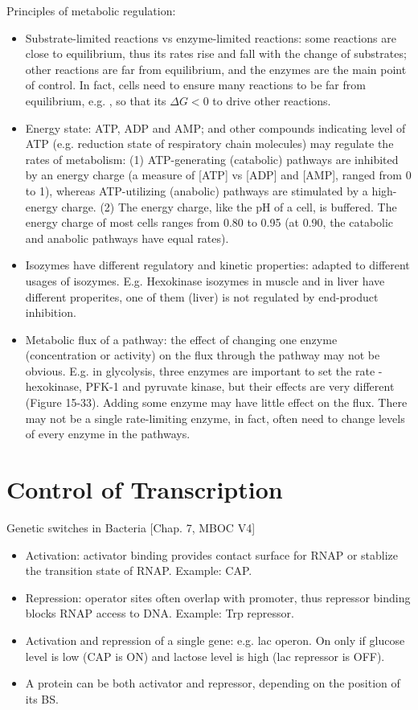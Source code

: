 \documentclass{report}
\begin{document}
\begin{enumerate}
Principles of metabolic regulation: 
\begin{itemize}
	\item Substrate-limited reactions vs enzyme-limited reactions: some reactions are close to equilibrium, thus its rates rise and fall with the change of substrates; other reactions are far from equilibrium, and the enzymes are the main point of control. In fact, cells need to ensure many reactions to be far from equilibrium, e.g. , so that its $\Delta G < 0$ to drive other reactions. 
	\item Energy state: ATP, ADP and AMP; and other compounds indicating level of ATP (e.g. reduction state of respiratory chain molecules) may regulate the rates of metabolism: (1) ATP-generating (catabolic) pathways are inhibited by an energy charge (a measure of [ATP] vs [ADP] and [AMP], ranged from 0 to 1), whereas ATP-utilizing (anabolic) pathways are stimulated by a high-energy charge. (2) The energy charge, like the pH of a cell, is buffered. The energy charge of most cells ranges from 0.80 to 0.95 (at 0.90, the catabolic and anabolic pathways have equal rates). 
	\item Isozymes have different regulatory and kinetic properties: adapted to different usages of isozymes. E.g. Hexokinase isozymes in muscle and in liver have different properites, one of them (liver) is not regulated by end-product inhibition. 
	\item Metabolic flux of a pathway: the effect of changing one enzyme (concentration or activity) on the flux through the pathway may not be obvious. E.g. in glycolysis, three enzymes are important to set the rate - hexokinase, PFK-1 and pyruvate kinase, but their effects are very different (Figure 15-33). Adding some enzyme may have little effect on the flux. There may not be a single rate-limiting enzyme, in fact, often need to change levels of every enzyme in the pathways.
\end{itemize}
	
\end{enumerate}
\section{Control of Transcription}

Genetic switches in Bacteria [Chap. 7, MBOC V4]
\begin{itemize}
	\item Activation: activator binding provides contact surface for RNAP or stablize the transition state of RNAP. Example: CAP. 
	\item Repression: operator sites often overlap with promoter, thus repressor binding blocks RNAP access to DNA. Example: Trp repressor. 
	\item Activation and repression of a single gene: e.g. lac operon. On only if glucose level is low (CAP is ON) and lactose level is high (lac repressor is OFF). 
	\item A protein can be both activator and repressor, depending on the position of its BS. 
\end{itemize}
\end{document}
